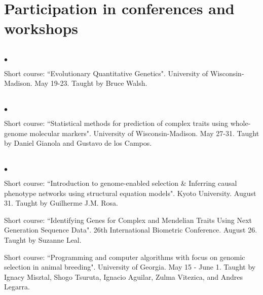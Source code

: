 \documentclass[margin,line,10pt]{res}
\newenvironment{list2}{
  \begin{list}{$\bullet$}{%
      \setlength{\itemsep}{0in}
      \setlength{\parsep}{0in} \setlength{\parskip}{0in}
      \setlength{\topsep}{0in} \setlength{\partopsep}{0in} 
      \setlength{\leftmargin}{0.2in}}}{\end{list}}
\begin{document}
\begin{resume}
\vspace{0.5cm}
\section{\sc Participation in conferences and workshops} 
\vspace{2cm}


\section{}
\begin{list2}
\item Short course: ``Evolutionary Quantitative Genetics". University of Wisconsin-Madison. May 19-23. 
Taught by Bruce Walsh. 
\end{list2}  


\section{}
\begin{list2}
\item Short course: ``Statistical methods for prediction of complex traits using whole-genome molecular markers". University of Wisconsin-Madison. May 27-31. 
Taught by Daniel Gianola and Gustavo de los Campos.
\end{list2}  

\section{}
\begin{list2}
\item Short course: ``Introduction to genome-enabled selection \& Inferring causal phenotype networks using structural equation models". 
Kyoto University. August 31. Taught by Guilherme J.M. Rosa. 

\vspace{0.5cm}

\item Short course: ``Identifying Genes for Complex and Mendelian Traits Using Next Generation Sequence Data". 26th International Biometric Conference. August 26. Taught by Suzanne Leal.  

\vspace{0.5cm}

\item Short course: ``Programming and computer algorithms with focus on genomic selection in animal breeding".  University of Georgia. May 15 - June 1.  
Taught by Ignacy Misztal, Shogo Tsuruta, Ignacio Aguilar, Zulma Vitezica, and  Andres Legarra. 
\end{list2}  


\end{resume}
\end{document}
